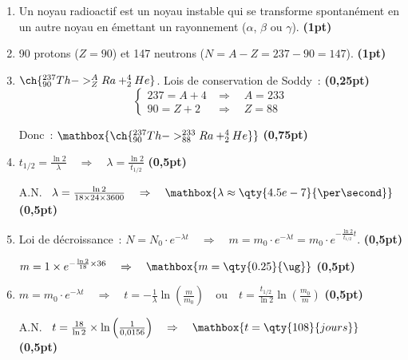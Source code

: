 \begin{enumerate}
    \item Un noyau radioactif est un noyau instable qui se transforme
          spontanément en un autre noyau en émettant un rayonnement ($\alpha$,
          $\beta$ ou $\gamma$). \hfill\textbf{(1pt)}
    \item 90 protons ($Z=90$) et 147 neutrons ($N=A-Z=237−90=147$).
          \hfill\textbf{(1pt)}
    \item $\ch{^{237}_{90}Th -> ^{A}_{Z}Ra + ^{4}_{2}He}$.
          Lois de conservation de Soddy~: \hfill\textbf{(0,25pt)}
          \[
              \begin{cases}
                  237 = A + 4 &\Rightarrow\quad A = 233 \\
                  90 = Z + 2 &\Rightarrow\quad Z = 88
              \end{cases}
          \]

          Donc~: $\mathbox{\ch{^{237}_{90}Th -> ^{233}_{88}Ra + ^{4}_{2}He}}$
          \hfill\textbf{(0,75pt)}
    \item $t_{1/2}=\frac{\ln 2}{\lambda}
          \quad\Rightarrow\quad
          \lambda=\frac{\ln 2}{t_{1/2}}$ \hfill\textbf{(0,5pt)}

          A.N. \ $\lambda=\frac{\ln 2}{18\times 24\times 3600}
          \quad\Rightarrow\quad
          \mathbox{\lambda \approx \qty{4.5e-7}{\per\second}}$
          \hfill\textbf{(0,5pt)}
    \item Loi de décroissance~:
          $N=N_0 \cdot e^{-\lambda t} \quad\Rightarrow\quad
          m=m_0 \cdot e^{-\lambda t}=
          m_0 \cdot e^{-\frac{\ln 2}{t_{1/2}} t}$.
          \hfill\textbf{(0,5pt)}

          $m=1\times e^{-\frac{\ln 2}{18}\times 36}
          \quad\Rightarrow\quad \mathbox{m=\qty{0.25}{\ug}}$
          \hfill\textbf{(0,5pt)}
    \item $m=m_0\cdot e^{-\lambda t}
          \quad\Rightarrow\quad
          t=-\frac{1}{\lambda}\ln\left(\frac{m}{m_0}\right)
          \quad\text{ou}\quad
          t=\frac{t_{1/2}}{\ln 2}\ln\left(\frac{m_0}{m}\right)$
          \hfill\textbf{(0,5pt)}

          A.N. \
          $t=\frac{18}{\ln 2}\times\ln\left(\frac{1}{0,0156}\right)
          \quad\Rightarrow\quad
          \mathbox{t=\qty{108}{jours}}$
          \hfill\textbf{(0,5pt)}
\end{enumerate}
